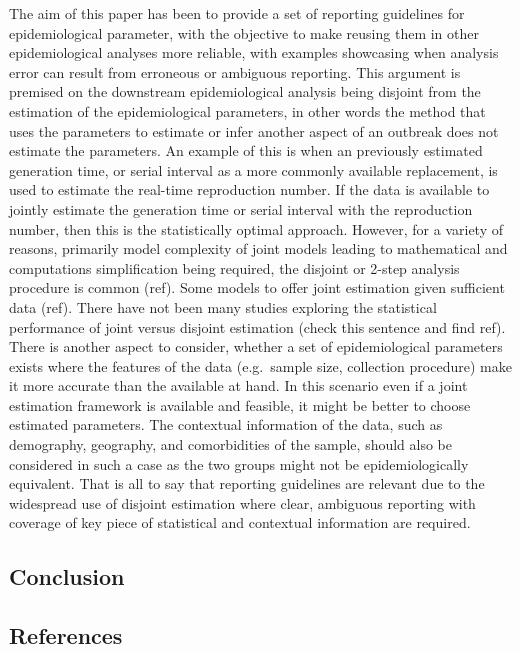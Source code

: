 \documentclass[
  10pt,
  letterpaper,
]{article}
\begin{document}
The aim of this paper has been to provide a set of reporting guidelines
for epidemiological parameter, with the objective to make reusing them
in other epidemiological analyses more reliable, with examples
showcasing when analysis error can result from erroneous or ambiguous
reporting. This argument is premised on the downstream epidemiological
analysis being disjoint from the estimation of the epidemiological
parameters, in other words the method that uses the parameters to
estimate or infer another aspect of an outbreak does not estimate the
parameters. An example of this is when an previously estimated
generation time, or serial interval as a more commonly available
replacement, is used to estimate the real-time reproduction number. If
the data is available to jointly estimate the generation time or serial
interval with the reproduction number, then this is the statistically
optimal approach. However, for a variety of reasons, primarily model
complexity of joint models leading to mathematical and computations
simplification being required, the disjoint or 2-step analysis procedure
is common (ref). Some models to offer joint estimation given sufficient
data (ref). There have not been many studies exploring the statistical
performance of joint versus disjoint estimation (check this sentence and
find ref). There is another aspect to consider, whether a set of
epidemiological parameters exists where the features of the data
(e.g.~sample size, collection procedure) make it more accurate than the
available at hand. In this scenario even if a joint estimation framework
is available and feasible, it might be better to choose estimated
parameters. The contextual information of the data, such as demography,
geography, and comorbidities of the sample, should also be considered in
such a case as the two groups might not be epidemiologically equivalent.
That is all to say that reporting guidelines are relevant due to the
widespread use of disjoint estimation where clear, ambiguous reporting
with coverage of key piece of statistical and contextual information are
required.

\subsection{Conclusion}\label{conclusion}

\subsection{References}\label{references}


\nolinenumbers
  
\end{document}
